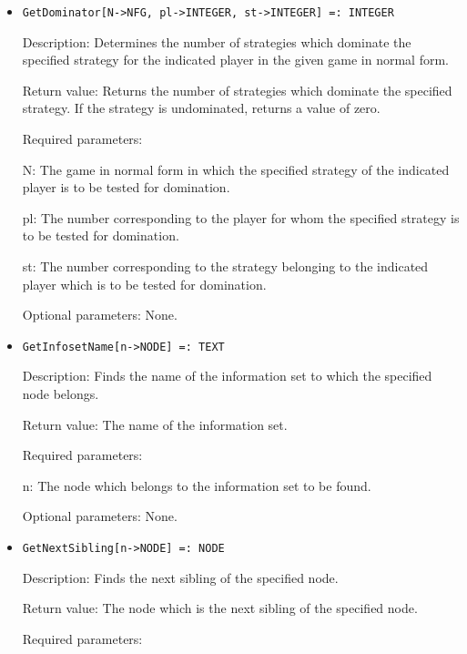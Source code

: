 \begin{itemize}
\item
\protect \large \begin{verbatim}
GetDominator[N->NFG, pl->INTEGER, st->INTEGER] =: INTEGER
\end{verbatim}\normalsize

\bd
\item
[Description:] Determines the number of strategies which dominate the
specified strategy for the indicated player in the given game in
normal form.
\item
[Return value:] Returns the number of strategies which dominate the
specified strategy.  If the strategy is undominated, returns a value
of zero.
\item
[Required parameters:]\hfil\null

\bd
\item
[N:] The game in normal form in which the specified strategy of the
indicated player is to be tested for domination.
\item
[pl:] The number corresponding to the player for whom the specified
strategy is to be tested for domination.
\item
[st:] The number corresponding to the strategy belonging to the
indicated player which is to be tested for domination.
\ed

\item
[Optional parameters:] None.
\ed

\item
\protect \large \begin{verbatim}
GetInfosetName[n->NODE] =: TEXT
\end{verbatim}\normalsize

\bd
\item
[Description:] Finds the name of the information set to which the
specified node belongs.
\item
[Return value:] The name of the information set.
\item
[Required parameters:]\hfil\null

\bd
\item
[n:] The node which belongs to the information set to be found.
\ed

\item
[Optional parameters:] None.
\ed

\item
\protect \large \begin{verbatim}
GetNextSibling[n->NODE] =: NODE
\end{verbatim}\normalsize

\bd
\item
[Description:] Finds the next sibling of the specified node.
\item
[Return value:] The node which is the next sibling of the specified
node.
\item
[Required parameters:]\hfil\null


\end{itemize}
